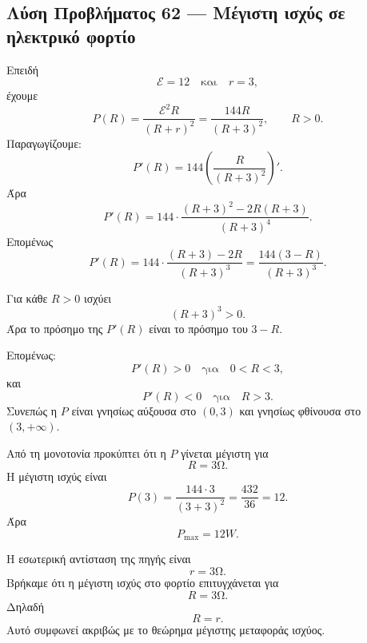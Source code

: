 \subsection*{Λύση Προβλήματος 62 --- Μέγιστη ισχύς σε ηλεκτρικό φορτίο}

\begin{alist}
  \item Επειδή
        \[
          \mathcal E=12
          \quad\text{και}\quad
          r=3,
        \]
        έχουμε
        \[
          P(R)=\frac{\mathcal E^2R}{(R+r)^2}
          =
          \frac{144R}{(R+3)^2},
          \qquad R>0.
        \]
        Παραγωγίζουμε:
        \[
          P'(R)
          =
          144\left(\frac{R}{(R+3)^2}\right)'.
        \]
        Άρα
        \[
          P'(R)
          =
          144\cdot
          \frac{(R+3)^2-2R(R+3)}{(R+3)^4}.
        \]
        Επομένως
        \[
          P'(R)
          =
          144\cdot
          \frac{(R+3)-2R}{(R+3)^3}
          =
          {
          \frac{144(3-R)}{(R+3)^3}
          }.
        \]

  \item Για κάθε \(R>0\) ισχύει
        \[
          (R+3)^3>0.
        \]
        Άρα το πρόσημο της \(P'(R)\) είναι το πρόσημο του \(3-R\).

        Επομένως:
        \[
          P'(R)>0
          \quad\text{για}\quad
          0<R<3,
        \]
        και
        \[
          P'(R)<0
          \quad\text{για}\quad
          R>3.
        \]
        Συνεπώς η \(P\) είναι γνησίως αύξουσα στο \((0,3)\) και
        γνησίως φθίνουσα στο \((3,+\infty)\).

  \item Από τη μονοτονία προκύπτει ότι η \(P\) γίνεται μέγιστη για
        \[
          {R=3\si{\ohm}}.
        \]
        Η μέγιστη ισχύς είναι
        \[
          P(3)=\frac{144\cdot3}{(3+3)^2}
          =
          \frac{432}{36}
          =
          12.
        \]
        Άρα
        \[
          {P_{\max}=12\si{W}}.
        \]

  \item Η εσωτερική αντίσταση της πηγής είναι
        \[
          r=3\si{\ohm}.
        \]
        Βρήκαμε ότι η μέγιστη ισχύς στο φορτίο επιτυγχάνεται για
        \[
          R=3\si{\ohm}.
        \]
        Δηλαδή
        \[
          {R=r}.
        \]
        Αυτό συμφωνεί ακριβώς με το θεώρημα μέγιστης μεταφοράς ισχύος.
\end{alist}

